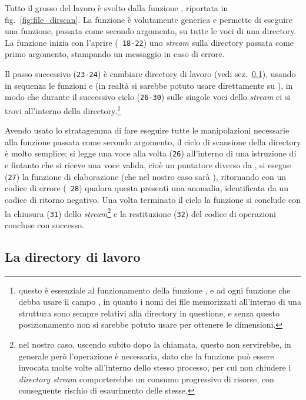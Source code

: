 Tutto il grosso del lavoro è svolto dalla funzione ,
riportata in fig.~\ref{fig:file_dirscan}. La funzione è volutamente generica e
permette di eseguire una funzione, passata come secondo argomento, su tutte le
voci di una directory.  La funzione inizia con l'aprire (\texttt{\small
  18-22}) uno \textit{stream} sulla directory passata come primo argomento,
stampando un messaggio in caso di errore.

Il passo successivo (\texttt{\small 23-24}) è cambiare directory di lavoro
(vedi sez.~\ref{sec:file_work_dir}), usando in sequenza le funzioni
 e  (in realtà si sarebbe potuto usare direttamente
 su ), in modo che durante il successivo ciclo
(\texttt{\small 26-30}) sulle singole voci dello \textit{stream} ci si trovi
all'interno della directory.\footnote{questo è essenziale al funzionamento
  della funzione , e ad ogni funzione che debba usare il campo
  , in quanto i nomi dei file memorizzati all'interno di una
  struttura  sono sempre relativi alla directory in questione,
  e senza questo posizionamento non si sarebbe potuto usare  per
  ottenere le dimensioni.}

Avendo usato lo stratagemma di fare eseguire tutte le manipolazioni necessarie
alla funzione passata come secondo argomento, il ciclo di scansione della
directory è molto semplice; si legge una voce alla volta (\texttt{\small 26})
all'interno di una istruzione di  e fintanto che si riceve una
voce valida, cioè un puntatore diverso da , si esegue
(\texttt{\small 27}) la funzione di elaborazione  (che nel nostro
caso sarà ), ritornando con un codice di errore (\texttt{\small
  28}) qualora questa presenti una anomalia, identificata da un codice di
ritorno negativo. Una volta terminato il ciclo la funzione si conclude con la
chiusura (\texttt{\small 31}) dello \textit{stream}\footnote{nel nostro caso,
  uscendo subito dopo la chiamata, questo non servirebbe, in generale però
  l'operazione è necessaria, dato che la funzione può essere invocata molte
  volte all'interno dello stesso processo, per cui non chiudere i
  \textit{directory stream} comporterebbe un consumo progressivo di risorse,
  con conseguente rischio di esaurimento delle stesse.} e la restituzione
(\texttt{\small 32}) del codice di operazioni concluse con successo.



\subsection{La directory di lavoro}
\label{sec:file_work_dir}

